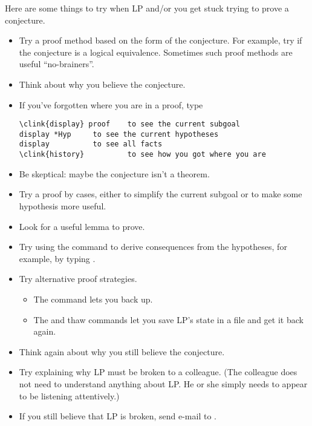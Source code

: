 Here are some things to try when LP and/or you get stuck trying to prove a
conjecture.  

\begin{itemize}
\item
Try a proof method based on the form of the conjecture.  For example, try
 if the conjecture is a logical equivalence.  Sometimes such
proof methods are useful ``no-brainers''.
\p
\item
Think about why you believe the conjecture.  
\p
\item
If you've forgotten where you are in a proof, type
\begin{verbatim}
\clink{display} proof    to see the current subgoal
display *Hyp     to see the current hypotheses
display          to see all facts
\clink{history}          to see how you got where you are
\end{verbatim}
\p
\item
Be skeptical: maybe the conjecture isn't a theorem.
\p
\item
Try a proof by cases, either to simplify the current subgoal or to make some
hypothesis more useful.
\p
\item
Look for a useful lemma to prove.
\p
\item
Try using the  command to derive consequences from the
hypotheses, for example, by typing .
\p
\item
Try alternative proof strategies.
\begin{itemize}
\item
The  command lets you back up.
\item
The  and thaw commands let you save LP's state in a file and get
it back again.
\end{itemize}
\p
\item
Think again about why you still believe the conjecture.
\p
\item
Try explaining why LP must be broken to a colleague.  (The colleague does not
need to understand anything about LP.  He or she simply needs to appear to be
listening attentively.)
\p
\item
If you still believe that LP is broken, send e-mail to .
\end{itemize}
